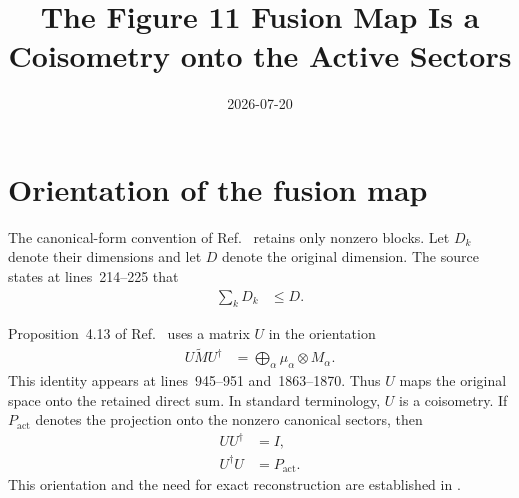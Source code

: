 \documentclass{article}
\title{The Figure 11 Fusion Map Is a Coisometry onto the Active Sectors}
\author{}
\date{2026-07-20}
\begin{document}
\maketitle
{}

\section{Orientation of the fusion map}

The canonical-form convention of Ref.~\cite{Cirac2016MPDO_arXiv} retains only
nonzero blocks. Let $D_k$ denote their dimensions and let $D$ denote the
original dimension. The source states at lines~214--225 that
\begin{align}
    \sum_k D_k
        &\leq D.
    \label{eq:cpsv16_figure11_fusion_coisometry_dimension_bound}
\end{align}

Proposition~4.13 of Ref.~\cite{Cirac2016MPDO_arXiv} uses a matrix $U$ in the
orientation
\begin{align}
    U\widetilde M U^\dagger
        &= \bigoplus_\alpha \mu_\alpha\otimes M_\alpha.
    \label{eq:cpsv16_figure11_fusion_coisometry_vertical_form}
\end{align}
This identity appears at lines~945--951 and~1863--1870. Thus $U$ maps the
original space onto the retained direct sum. In standard terminology, $U$ is
a coisometry. If $P_{\mathrm{act}}$ denotes the projection onto the nonzero
canonical sectors, then
\begin{align}
    UU^\dagger
        &= I,
    \label{eq:cpsv16_figure11_fusion_coisometry_vertical_row_identity}\\
    U^\dagger U
        &= P_{\mathrm{act}}.
    \label{eq:cpsv16_figure11_fusion_coisometry_vertical_active_projection}
\end{align}
This orientation and the need for exact reconstruction are established in
.
\end{document}
